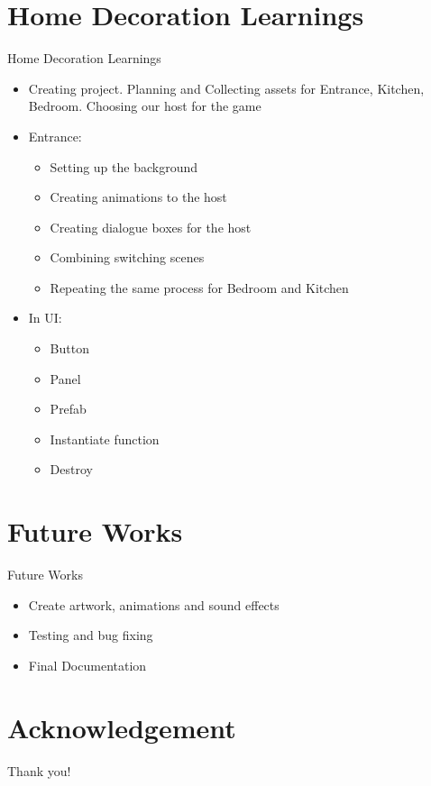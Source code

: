 \documentclass[10pt]{beamer}
\begin{document}
\section{Home Decoration Learnings}
    \begin{frame}{Home Decoration Learnings}
     \begin{itemize}
        \item Creating project. Planning and Collecting assets for Entrance, Kitchen, Bedroom. Choosing our host for the game
        \item Entrance:
        \begin{itemize}
        \item Setting up the background
	  \item Creating animations to the host
 	  \item Creating dialogue boxes for the host
        \item Combining switching scenes
        \item Repeating the same process for Bedroom and Kitchen
       \end{itemize}
        
        \item In UI:
        \begin{itemize}
        \item Button
        \item Panel
        \item Prefab
        \item Instantiate function 
        \item Destroy
	  
       \end{itemize}
        
    \end{itemize}
    \end{frame}


\section{Future Works}
    \begin{frame}{Future Works}
     \begin{itemize}
         \item Create artwork, animations and sound effects
        \item Testing and bug fixing
        \item Final Documentation
    \end{itemize}
    \end{frame}
\section*{Acknowledgement}  
\begin{frame}
\textcolor{myNewColorA}{\Huge{\centerline{Thank you!}}}
\end{frame}
\end{document}
